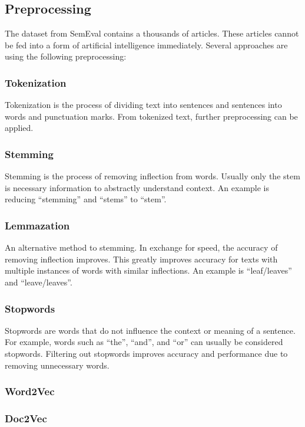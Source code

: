 \subsection{Preprocessing}
The dataset from SemEval contains a thousands of articles. These articles cannot be fed into a form of artificial intelligence immediately. Several approaches are using the following preprocessing:

\subsubsection{Tokenization}
Tokenization is the process of dividing text into sentences and sentences into words and punctuation marks.
From tokenized text, further preprocessing can be applied.

\subsubsection{Stemming}
Stemming is the process of removing inflection from words.
Usually only the stem is necessary information to abstractly understand context.
An example is reducing ``stemming'' and ``stems'' to ``stem''.

\subsubsection{Lemmazation}
An alternative method to stemming.
In exchange for speed, the accuracy of removing inflection improves.
This greatly improves accuracy for texts with multiple instances of words with similar inflections.
An example is ``leaf/leaves'' and ``leave/leaves''.

\subsubsection{Stopwords}
Stopwords are words that do not influence the context or meaning of a sentence.
For example, words such as ``the'', ``and'', and ``or'' can usually be considered stopwords.
Filtering out stopwords improves accuracy and performance due to removing unnecessary words.


\subsubsection{Word2Vec}
\subsubsection{Doc2Vec}



